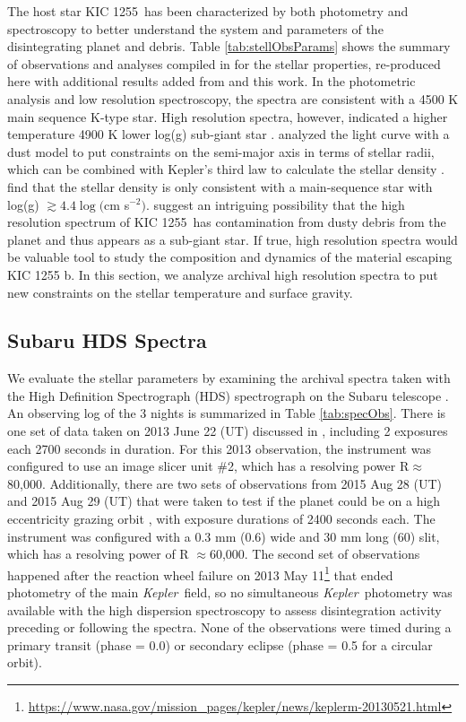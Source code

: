 \documentclass[preprint]{aastex61}
\newcommand{\sha}{KIC 1255 b}
\newcommand{\shStar}{KIC 1255}
\newcommand{\kepler}{{\it Kepler}}
\begin{document}
The host star \shStar\ has been characterized by both photometry and spectroscopy to better understand the system and parameters of the disintegrating planet and debris.
Table \ref{tab:stellObsParams} shows the summary of observations and analyses compiled in \citet{vanlieshout2016kic1255} for the stellar properties, re-produced here with additional results added from \citet{morton2016falsePos} and this work.
In the photometric analysis and low resolution spectroscopy, the spectra are consistent with a 4500 K main sequence K-type star.
High resolution spectra, however, indicated a higher temperature 4900 K lower log(g) sub-giant star \citep{kawahara2013starspots}.
\citet{vanlieshout2016kic1255} analyzed the light curve with a dust model to put constraints on the semi-major axis in terms of stellar radii, which can be combined with Kepler's third law to calculate the stellar density \citep{seager2003uniqueSolution}.
\citet{vanlieshout2016kic1255} find that the stellar density is only consistent with a main-sequence star with log(g) $\gtrsim 4.4 \log($cm s$^{-2})$.
\citet{vanlieshout2016kic1255} suggest an intriguing possibility that the high resolution spectrum of \shStar\ has contamination from dusty debris from the planet and thus appears as a sub-giant star.
If true, high resolution spectra would be valuable tool to study the composition and dynamics of the material escaping \sha.
In this section, we analyze archival high resolution spectra to put new constraints on the stellar temperature and surface gravity.

\subsection{Subaru HDS Spectra}\label{sec:SubaruDescrip}

We evaluate the stellar parameters by examining the archival spectra taken with the High Definition Spectrograph (HDS) spectrograph on the Subaru telescope \citep{noguchi2002hds}.
An observing log of the 3 nights is summarized in Table \ref{tab:specObs}.
There is one set of data taken on 2013 June 22 (UT) discussed in \citet{kawahara2013starspots}, including 2 exposures each 2700 seconds in duration.
For this 2013 observation, the instrument was configured to use an image slicer unit \#2, which has a resolving power R$\approx$80,000.
Additionally, there are two sets of observations from 2015 Aug 28 (UT) and 2015 Aug 29 (UT) that were taken to test if the planet could be on a high eccentricity grazing orbit \citep{masuda2018rvKIC1255}, with exposure durations of 2400 seconds each.
The instrument was configured with a 0.3 mm (0.6\arcsec) wide and 30 mm long (60\arcsec) slit, which has a resolving power of R $\approx$60,000.
The second set of observations happened after the reaction wheel failure on 2013 May 11\footnote{\url{https://www.nasa.gov/mission_pages/kepler/news/keplerm-20130521.html}} that ended photometry of the main \kepler\ field, so no simultaneous \kepler\ photometry was available with the high dispersion spectroscopy to assess disintegration activity preceding or following the spectra.
None of the observations were timed during a primary transit (phase = 0.0) or secondary eclipse (phase = 0.5 for a circular orbit).
\end{document}
